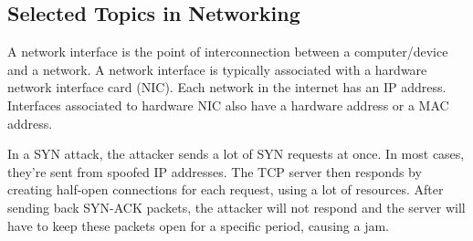 \documentclass[a4paper]{article}
\theoremstyle{plain}
\theoremstyle{definition}
\newtheorem{defn}{Definition}[section]
\theoremstyle{remark}
\begin{document}
\subsection{Selected Topics in Networking}
\begin{tcolorbox}[colback=black!3!white,colframe=black!60!white,title=\begin{defn}Network Interface \label{Network Interface}\end{defn}]
A network interface is the point of interconnection between a computer/device and a network. A network interface is typically associated with a hardware network interface card (NIC). Each network in the internet has an IP address. Interfaces associated to hardware NIC also have a hardware address or a MAC address. 
\end{tcolorbox}
\begin{tcolorbox}[colback=black!3!white,colframe=black!60!white,title=\begin{defn}SYN attack \label{SYN attack}\end{defn}]
In a SYN attack, the attacker sends a lot of SYN requests at once. In most cases, they're sent from spoofed IP addresses. The TCP server then responds by creating half-open connections for each request, using a lot of resources. After sending back SYN-ACK packets, the attacker will not respond and the server will have to keep these packets open for a specific period, causing a jam. 
\end{tcolorbox}
\end{document}
